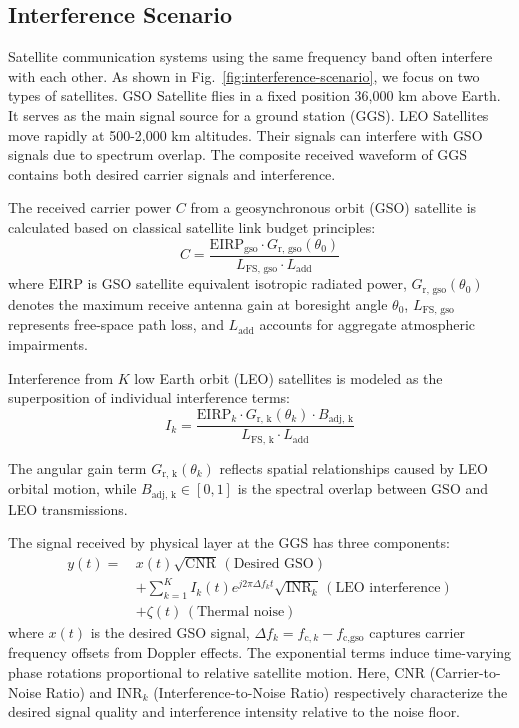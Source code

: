 \documentclass[conference]{IEEEtran}
\begin{document}
\subsection{Interference Scenario}



Satellite communication systems using the same frequency band often interfere with each other. As shown in Fig.~\ref{fig:interference-scenario}, we focus on two types of satellites. GSO Satellite flies in a fixed position 36,000 km above Earth. It serves as the main signal source for a ground station (GGS). LEO Satellites move rapidly at 500-2,000 km altitudes. Their signals can interfere with GSO signals due to spectrum overlap. The composite received waveform of GGS contains both desired carrier signals and interference.

The received carrier power $C$ from a geosynchronous orbit (GSO) satellite is calculated based on classical satellite link budget principles:
\begin{equation}
    C = \frac{\text{EIRP}_{\text{gso}} \cdot G_{\text{r, gso}}(\theta_0)}{L_{\text{FS, gso}} \cdot L_{\text{add}}}
    \label{eq:carrier_power}
\end{equation}
where $\text{EIRP}$ is GSO satellite equivalent isotropic radiated power, $G_{\text{r, gso}}(\theta_0)$ denotes the maximum receive antenna gain at boresight angle $\theta_0$, $L_{\text{FS, gso}}$ represents free-space path loss, and $L_{\text{add}}$ accounts for aggregate atmospheric impairments.

Interference from $K$ low Earth orbit (LEO) satellites is modeled as the superposition of individual interference terms:
\begin{equation}
    I_k = \frac{\text{EIRP}_k \cdot G_{\text{r, k}}(\theta_k) \cdot B_{\text{adj, k}}}{L_{\text{FS, k}} \cdot L_{\text{add}}}
    \label{eq:interference_power}
\end{equation}

The angular gain term $G_{\text{r, k}}(\theta_k)$ reflects spatial relationships caused by LEO orbital motion, while $B_{\text{adj, k}} \in [0,1]$ is the spectral overlap between GSO and LEO transmissions.

The signal received by physical layer at the GGS has three components:
\begin{align}
    y(t) =\, & x(t)\sqrt{\text{CNR}}\, (\text{Desired GSO}) \nonumber                                                 \\[0.5em]
             & + \sum_{k=1}^{K} I_k(t)e^{j2\pi \Delta f_k t}\sqrt{\text{INR}_k}\, (\text{LEO interference}) \nonumber \\[0.5em]
             & + \zeta(t)\, (\text{Thermal noise})
\end{align}
where $x(t)$  is the desired GSO signal, $\Delta f_k = f_{\text{c},k} - f_{\text{c,gso}}$ captures carrier frequency offsets from Doppler effects. The exponential terms induce time-varying phase rotations proportional to relative satellite motion. Here, $\text{CNR}$ (Carrier-to-Noise Ratio) and $\text{INR}_k$ (Interference-to-Noise Ratio) respectively characterize the desired signal quality and interference intensity relative to the noise floor.
\end{document}
